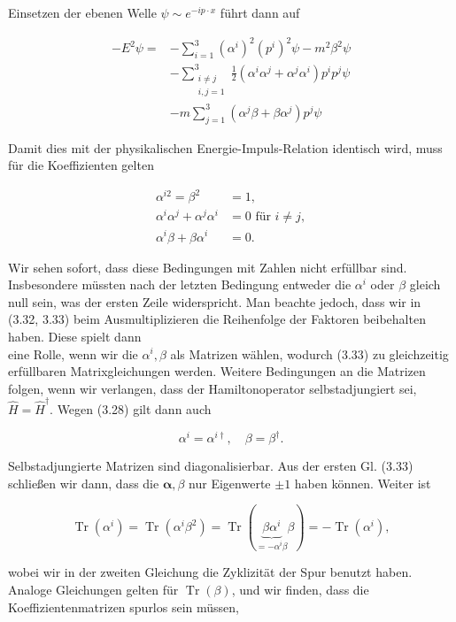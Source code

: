 \documentclass[10pt, letterpaper]{article}
\begin{document}
Einsetzen der ebenen Welle $\psi \sim e^{-i p \cdot x}$ führt dann auf

$$
\begin{aligned}
-E^{2} \psi= & -\sum_{i=1}^{3}\left(\alpha^{i}\right)^{2}\left(p^{i}\right)^{2} \psi-m^{2} \beta^{2} \psi \\
& -\sum_{\substack{i \neq j \\
i, j=1}}^{3} \frac{1}{2}\left(\alpha^{i} \alpha^{j}+\alpha^{j} \alpha^{i}\right) p^{i} p^{j} \psi \\
& -m \sum_{j=1}^{3}\left(\alpha^{j} \beta+\beta \alpha^{j}\right) p^{j} \psi
\end{aligned}
$$

Damit dies mit der physikalischen Energie-Impuls-Relation identisch wird, muss für die Koeffizienten gelten

$$
\begin{aligned}
\alpha^{i 2}=\beta^{2} & =1, \\
\alpha^{i} \alpha^{j}+\alpha^{j} \alpha^{i} & =0 \text { für } i \neq j, \\
\alpha^{i} \beta+\beta \alpha^{i} & =0 .
\end{aligned}
$$

Wir sehen sofort, dass diese Bedingungen mit Zahlen nicht erfüllbar sind. Insbesondere müssten nach der letzten Bedingung entweder die $\alpha^{i}$ oder $\beta$ gleich null sein, was der ersten Zeile widerspricht. Man beachte jedoch, dass wir in (3.32, 3.33) beim Ausmultiplizieren die Reihenfolge der Faktoren beibehalten haben. Diese spielt dann\\
eine Rolle, wenn wir die $\alpha^{i}, \beta$ als Matrizen wählen, wodurch (3.33) zu gleichzeitig erfüllbaren Matrixgleichungen werden. Weitere Bedingungen an die Matrizen folgen, wenn wir verlangen, dass der Hamiltonoperator selbstadjungiert sei, $\hat{H}=\hat{H}^{\dagger}$. Wegen (3.28) gilt dann auch

$$
\alpha^{i}=\alpha^{i \dagger}, \quad \beta=\beta^{\dagger} .
$$

Selbstadjungierte Matrizen sind diagonalisierbar. Aus der ersten Gl. (3.33) schließen wir dann, dass die $\boldsymbol{\alpha}, \beta$ nur Eigenwerte $\pm 1$ haben können. Weiter ist

$$
\operatorname{Tr}\left(\alpha^{i}\right)=\operatorname{Tr}\left(\alpha^{i} \beta^{2}\right)=\operatorname{Tr}(\underbrace{\beta \alpha^{i}}_{=-\alpha^{i} \beta} \beta)=-\operatorname{Tr}\left(\alpha^{i}\right),
$$

wobei wir in der zweiten Gleichung die Zyklizität der Spur benutzt haben. Analoge Gleichungen gelten für $\operatorname{Tr}(\beta)$, und wir finden, dass die Koeffizientenmatrizen spurlos sein müssen,
\end{document}
